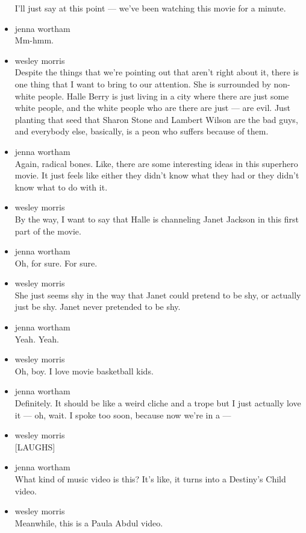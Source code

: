 \begin{itemize}
  I'll just say at this point --- we've been watching this movie for a
  minute.
\item
  jenna wortham\\
  Mm-hmm.
\item
  wesley morris\\
  Despite the things that we're pointing out that aren't right about it,
  there is one thing that I want to bring to our attention. She is
  surrounded by non-white people. Halle Berry is just living in a city
  where there are just some white people, and the white people who are
  there are just --- are evil. Just planting that seed that Sharon Stone
  and Lambert Wilson are the bad guys, and everybody else, basically, is
  a peon who suffers because of them.
\item
  jenna wortham\\
  Again, radical bones. Like, there are some interesting ideas in this
  superhero movie. It just feels like either they didn't know what they
  had or they didn't know what to do with it.
\item
  wesley morris\\
  By the way, I want to say that Halle is channeling Janet Jackson in
  this first part of the movie.
\item
  jenna wortham\\
  Oh, for sure. For sure.
\item
  wesley morris\\
  She just seems shy in the way that Janet could pretend to be shy, or
  actually just be shy. Janet never pretended to be shy.
\item
  jenna wortham\\
  Yeah. Yeah.
\item
  wesley morris\\
  Oh, boy. I love movie basketball kids.
\item
  jenna wortham\\
  Definitely. It should be like a weird cliche and a trope but I just
  actually love it --- oh, wait. I spoke too soon, because now we're in
  a ---
\item
  wesley morris\\
  {[}LAUGHS{]}
\item
  jenna wortham\\
  What kind of music video is this? It's like, it turns into a Destiny's
  Child video.
\item
  wesley morris\\
  Meanwhile, this is a Paula Abdul video.

\end{itemize}
